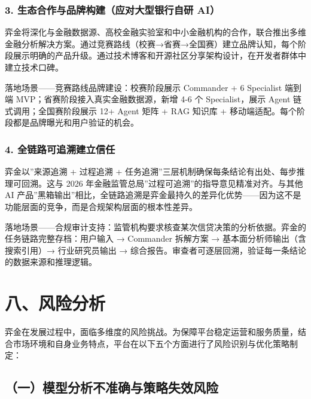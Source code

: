 \documentclass[
]{ctexart}
\begin{document}
\subsubsection{3. 生态合作与品牌构建（应对大型银行自研
AI）}\label{ux751fux6001ux5408ux4f5cux4e0eux54c1ux724cux6784ux5efaux5e94ux5bf9ux5927ux578bux94f6ux884cux81eaux7814-ai}

弈金将深化与金融数据源、高校金融实验室和中小金融机构的合作，联合推出多维金融分析解决方案。通过竞赛路线（校赛→省赛→全国赛）建立品牌认知，每个阶段展示明确的产品升级。通过技术博客和开源社区分享架构设计，在开发者群体中建立技术口碑。

落地场景------竞赛路线品牌建设：校赛阶段展示 Commander + 6 Specialist
端到端 MVP；省赛阶段接入真实金融数据源，新增 4-6 个 Specialist，展示
Agent 链式调用；全国赛阶段展示 12+ Agent 矩阵 + RAG 知识库 +
移动端适配。每个阶段都是品牌曝光和用户验证的机会。

\subsubsection{4.
全链路可追溯建立信任}\label{ux5168ux94feux8defux53efux8ffdux6eafux5efaux7acbux4fe1ux4efb}

弈金以''来源追溯 + 过程追溯 +
任务追溯''三层机制确保每条结论有出处、每步推理可回溯。这与 2026
年金融监管总局''过程可追溯''的指导意见精准对齐。与其他 AI
产品''黑箱输出''相比，全链路追溯是弈金最持久的差异化优势------因为这不是功能层面的竞争，而是合规架构层面的根本性差异。

落地场景------合规审计支持：监管机构要求核查某次信贷决策的分析依据。弈金的任务链路完整存档：用户输入
→ Commander 拆解方案 → 基本面分析师输出（含搜索引用）→ 行业研究员输出 →
综合报告。审查者可逐层回溯，验证每一条结论的数据来源和推理逻辑。

\section{八、风险分析}\label{ux516bux98ceux9669ux5206ux6790}

弈金在发展过程中，面临多维度的风险挑战。为保障平台稳定运营和服务质量，结合市场环境和自身业务特点，平台在以下五个方面进行了风险识别与优化策略制定：

\subsection{（一）模型分析不准确与策略失效风险}\label{ux4e00ux6a21ux578bux5206ux6790ux4e0dux51c6ux786eux4e0eux7b56ux7565ux5931ux6548ux98ceux9669}
\end{document}
